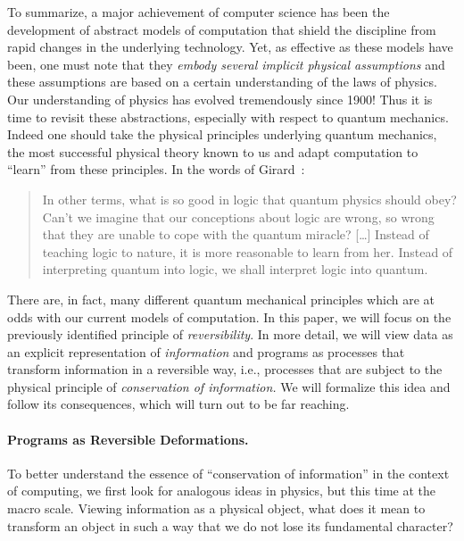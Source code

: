 \documentclass{article}
\begin{document}
To summarize, a major achievement of computer science has been the
development of abstract models of computation that shield the
discipline from rapid changes in the underlying technology. Yet, as
effective as these models have been, one must note that they
\emph{embody several implicit physical assumptions} and these
assumptions are based on a certain understanding of the laws of
physics. Our understanding of physics has evolved tremendously since
1900!  Thus it is time to revisit these abstractions, especially with
respect to quantum mechanics.  Indeed one should take the physical
principles underlying quantum mechanics, the most successful physical
theory known to us and adapt computation to ``learn'' from these
principles.  In the words of Girard~\cite{Girard:2007:TMI:1348911.1348915}:
\begin{quote}
  In other terms, what is so good in logic that quantum physics should
  obey?  Can't we imagine that our conceptions about logic are wrong,
  so wrong that they are unable to cope with the quantum miracle?
  [\ldots] Instead of teaching logic to nature, it is more reasonable
  to learn from her. Instead of interpreting quantum into logic, we
  shall interpret logic into quantum.
\end{quote}

There are, in fact, many different quantum mechanical principles which
are at odds with our current models of computation. In this paper, we
will focus on the previously identified principle of
\emph{reversibility}. In more detail, we will view data as an explicit
representation of \emph{information} and programs as processes that
transform information in a reversible way, i.e., processes that are
subject to the physical principle of \emph{conservation of
  information.} We will formalize this idea and follow its
consequences, which will turn out to be far reaching.

\paragraph*{Programs as Reversible Deformations.}

To better understand the essence of ``conservation of information'' in
the context of computing, we first look for analogous ideas in
physics, but this time at the macro scale. Viewing information as a
physical object, what does it mean to transform an object in such a
way that we do not lose its fundamental character?
\end{document}

